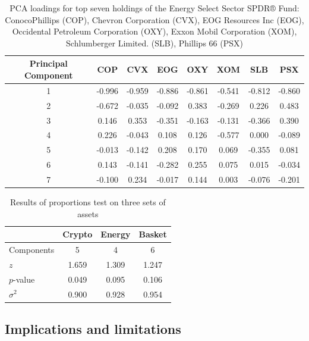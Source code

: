 \documentclass[12pt,twoside]{article}
\newcommand{\head}[1]{\textnormal{\textbf{#1}}}
\begin{document}
\begin{table}[h!]
	\centering
	\begin{tabular}{cccccccc}
		\toprule
		\head{Principal Component} & \head{COP} & \head{CVX} & \head{EOG} &      \head{OXY} & \head{XOM} & \head{SLB} & \head{PSX} \\
		\midrule
		1         & -0.996 & -0.959 & -0.886 & -0.861 & -0.541 & -0.812 & -0.860 \\
		2         & -0.672 & -0.035 & -0.092 &  0.383 & -0.269 &  0.226 &  0.483 \\
		3         &  0.146 &  0.353 & -0.351 & -0.163 & -0.131 & -0.366 &  0.390 \\
		4         &  0.226 & -0.043 &  0.108 &  0.126 & -0.577 &  0.000 & -0.089 \\
		5         & -0.013 & -0.142 &  0.208 &  0.170 &  0.069 & -0.355 &  0.081 \\
		6         &  0.143 & -0.141 & -0.282 &  0.255 &  0.075 &  0.015 & -0.034 \\
		7         & -0.100 &  0.234 & -0.017 &  0.144 &  0.003 & -0.076 & -0.201 \\
		\bottomrule
	\end{tabular}
	\caption{PCA loadings for top seven holdings of the Energy Select Sector SPDR® Fund: ConocoPhillips (COP), Chevron Corporation (CVX), EOG Resources Inc (EOG), Occidental Petroleum Corporation (OXY), Exxon Mobil Corporation (XOM), Schlumberger Limited. (SLB), Phillips 66 (PSX)}
	\label{table:6}
\end{table}


\begin{table}[h!]
	\centering
	\begin{tabular}{lccc}
		\toprule
		{} &  \head{Crypto} &  \head{Energy} &  \head{Basket} \\
		\midrule
		Components &   5 &   4 &   6 \\
		$z$        &   1.659 &   1.309 &   1.247 \\
		$p$-value  &   0.049 &   0.095 &   0.106 \\
		$\sigma^2$ &   0.900 &   0.928 &   0.954 \\
		\bottomrule
	\end{tabular}
	\caption{Results of proportions test on three sets of assets}
	\label{table:7}
\end{table}

\subsection{Implications and limitations}
\end{document}
